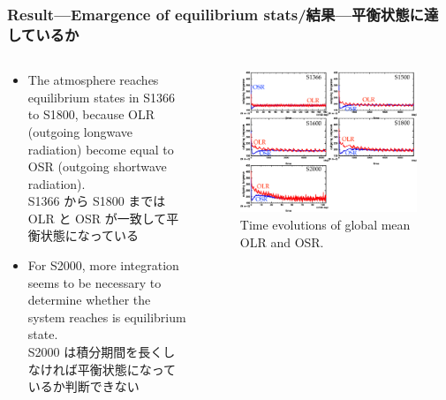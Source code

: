 \documentclass[aspectratio=149,9pt,fleqn,tbtags]{beamer}
\newcommand{\jp}[1]{{\footnotesize #1}}
\begin{document}
\begin{frame}
	\frametitle{Result---Emargence of equilibrium stats/結果---平衡状態に達しているか}
	\begin{columns}[T]
		\begin{column}{.45\textwidth}
			\begin{itemize}
				\item The atmosphere reaches equilibrium states in S1366 to S1800,
					because OLR (outgoing longwave radiation)
					become equal to OSR (outgoing shortwave radiation).\\
					\jp{S1366 から S1800 までは OLR と OSR が一致して平衡状態になっている}
				\item For S2000, more integration seems to be necessary
					to determine whether the system reaches is equilibrium state.\\
					\jp{S2000 は積分期間を長くしなければ平衡状態になっているか判断できない}
			\end{itemize}
		\end{column}
		\begin{column}{.5\textwidth}
			\begin{figure}[t]
				\centering\scriptsize
				\includegraphics[width=\textwidth]{fig-osr-olr.pdf}
				Time evolutions of global mean OLR and OSR.
			\end{figure}
		\end{column}
	\end{columns}
\end{frame}
\end{document}
